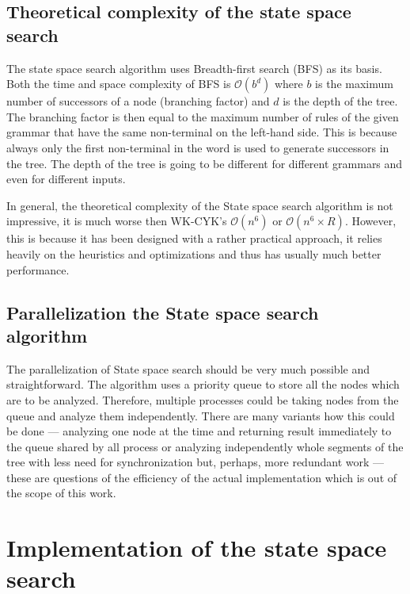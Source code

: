 \section{Theoretical complexity of the state space search}
The state space search algorithm uses Breadth-first search (BFS) as its basis. Both the time and space complexity of BFS is $\mathcal{O}(b^d)$ where $b$ is the maximum number of successors of a node (branching factor) and $d$ is the depth of the tree. The branching factor is then equal to the maximum number of rules of the given grammar that have the same non-terminal on the left-hand side. This is because always only the first non-terminal in the word is used to generate successors in the tree. The depth of the tree is going to be different for different grammars and even for different inputs.

In general, the theoretical complexity of the State space search algorithm is not impressive, it is much worse then WK-CYK's $\mathcal{O}(n^6)$ or $\mathcal{O}(n^6 \times R)$. However, this is because it has been designed with a rather practical approach, it relies heavily on the heuristics and optimizations and thus has usually much better performance.

\section{Parallelization the State space search algorithm}
The parallelization of State space search should be very much possible and straightforward. The algorithm uses a priority queue to store all the nodes which are to be analyzed. Therefore, multiple processes could be taking nodes from the queue and analyze them independently. There are many variants how this could be done --- analyzing one node at the time and returning result immediately to the queue shared by all process or analyzing independently whole segments of the tree with less need for synchronization but, perhaps, more redundant work --- these are questions of the efficiency of the actual implementation which is out of the scope of this work.

\chapter{Implementation of the state space search} \label{chapter:implementation}

